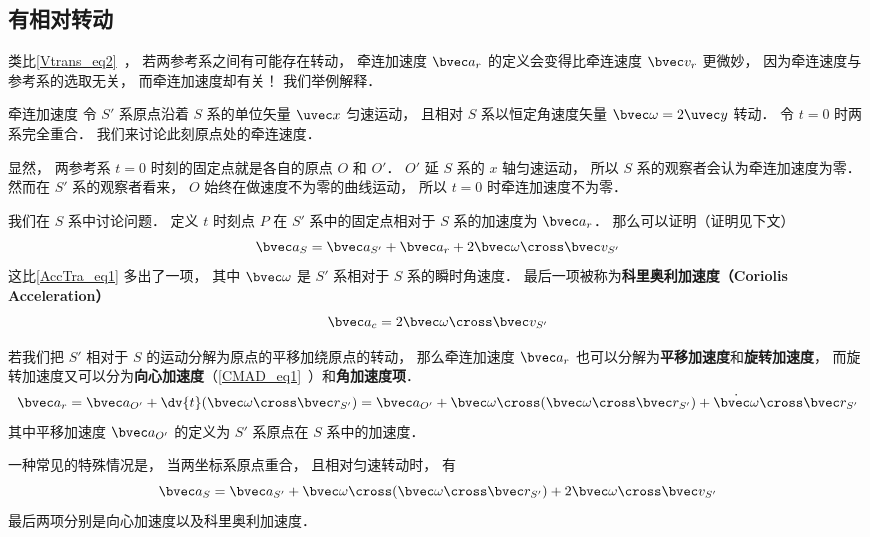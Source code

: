 \subsection{有相对转动}
类比\autoref{Vtrans_eq2}~， 若两参考系之间有可能存在转动， 牵连加速度 $\bvec a_{r}$ 的定义会变得比牵连速度 $\bvec v_r$ 更微妙， 因为牵连速度与参考系的选取无关， 而牵连加速度却有关！ 我们举例解释．

\begin{example}{牵连加速度}
令 $S'$ 系原点沿着 $S$ 系的单位矢量 $\uvec x$ 匀速运动， 且相对 $S$ 系以恒定角速度矢量 $\bvec \omega = 2\uvec y$ 转动． 令 $t = 0$ 时两系完全重合． 我们来讨论此刻原点处的牵连速度．

显然， 两参考系 $t = 0$ 时刻的固定点就是各自的原点 $O$ 和 $O'$． $O'$ 延 $S$ 系的 $x$ 轴匀速运动， 所以 $S$ 系的观察者会认为牵连加速度为零． 然而在 $S'$ 系的观察者看来， $O$ 始终在做速度不为零的曲线运动， 所以 $t = 0$ 时牵连加速度不为零．
\end{example}

我们在 $S$ 系中讨论问题． 定义 $t$ 时刻点 $P$ 在 $S'$ 系中的固定点相对于 $S$ 系的加速度为 $\bvec a_{r}$． 那么可以证明（证明见下文）
\begin{equation}\label{AccTra_eq2}
\bvec a_S = \bvec a_{S'} + \bvec a_{r} + 2 \bvec \omega \cross \bvec v_{S'}
\end{equation}
这比\autoref{AccTra_eq1} 多出了一项， 其中 $\bvec \omega$ 是 $S'$ 系相对于 $S$ 系的瞬时角速度． 最后一项被称为\textbf{科里奥利加速度（Coriolis Acceleration）}
\begin{equation}\label{AccTra_eq4}
\bvec a_c = 2 \bvec \omega \cross \bvec v_{S'}
\end{equation}

若我们把 $S'$ 相对于 $S$ 的运动分解为原点的平移加绕原点的转动， 那么牵连加速度 $\bvec a_r$ 也可以分解为\textbf{平移加速度}和\textbf{旋转加速度}， 而旋转加速度又可以分为\textbf{向心加速度}（\autoref{CMAD_eq1}~）和\textbf{角加速度项}．
\begin{equation}\label{AccTra_eq5}
\bvec a_{r} = \bvec a_{O'} + \dv{t}(\bvec\omega\cross\bvec r_{S'})
= \bvec a_{O'} + \bvec\omega\cross(\bvec\omega\cross\bvec r_{S'}) + \dot{\bvec\omega} \cross\bvec r_{S'}
\end{equation}
其中平移加速度 $\bvec a_{O'}$ 的定义为 $S'$ 系原点在 $S$ 系中的加速度．

一种常见的特殊情况是， 当两坐标系原点重合， 且相对匀速转动时， 有
\begin{equation}
\bvec a_S = \bvec a_{S'} + \bvec\omega\cross(\bvec\omega\cross\bvec r_{S'}) + 2 \bvec \omega \cross \bvec v_{S'}
\end{equation}
最后两项分别是向心加速度以及科里奥利加速度．

